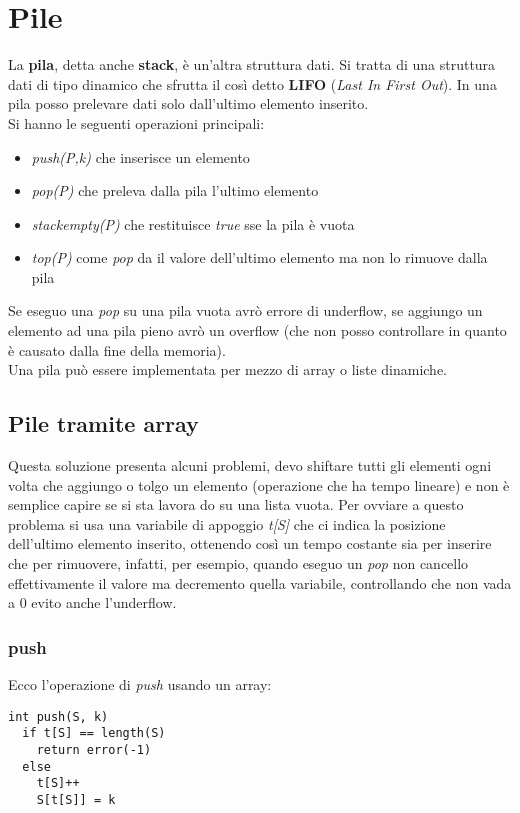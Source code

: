 \documentclass[a4paper,12pt,oneside,tikz]{book}
\begin{document}
\section{Pile}
La \textbf{pila}, detta anche \textbf{stack}, è un'altra struttura dati. Si tratta di una struttura dati di tipo dinamico che sfrutta il così detto \textbf{LIFO} (\textit{Last In First Out}). In una pila posso prelevare dati solo dall'ultimo elemento inserito.\\Si hanno le seguenti operazioni principali:
\begin{itemize}
	\item \textit{push(P,k)} che inserisce un elemento
	\item \textit{pop(P)} che preleva dalla pila l'ultimo elemento
	\item \textit{stackempty(P)} che restituisce \textit{true} sse la pila è vuota
	\item \textit{top(P)} come \textit{pop} da il valore dell'ultimo elemento ma non lo rimuove dalla pila
\end{itemize}
Se eseguo una \textit{pop }su una pila vuota avrò errore di underflow, se aggiungo un elemento ad una pila pieno avrò un overflow (che non posso controllare in quanto è causato dalla fine della memoria).\\Una pila può essere implementata per mezzo di array o liste dinamiche.
\subsection{Pile tramite array}
Questa soluzione presenta alcuni problemi, devo shiftare tutti gli elementi ogni volta che aggiungo o tolgo un elemento (operazione che ha tempo lineare) e non è semplice capire se si sta lavora do su una lista vuota. Per ovviare a questo problema si usa una variabile di appoggio \textit{t[S]} che ci indica la posizione dell'ultimo elemento inserito, ottenendo così un tempo costante sia per inserire che per rimuovere, infatti, per esempio, quando eseguo un \textit{pop} non cancello effettivamente il valore ma decremento quella variabile, controllando che non vada a 0 evito anche l'underflow.
\subsubsection{push}
Ecco l'operazione di \textit{push} usando un array:
\begin{verbatim}
int push(S, k)
  if t[S] == length(S)
    return error(-1)
  else
    t[S]++
    S[t[S]] = k
\end{verbatim}
\end{document}
